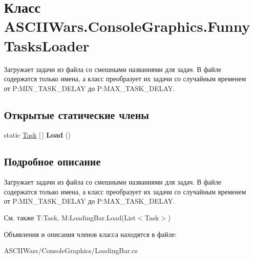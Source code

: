\hypertarget{class_a_s_c_i_i_wars_1_1_console_graphics_1_1_funny_tasks_loader}{}\section{Класс A\+S\+C\+I\+I\+Wars.\+Console\+Graphics.\+Funny\+Tasks\+Loader}
\label{class_a_s_c_i_i_wars_1_1_console_graphics_1_1_funny_tasks_loader}


Загружает задачи из файла со смешными названиями для задач. В файле содержатся только имена, а класс преобразует их задачи со случайным временем от P\+:\+M\+I\+N\+\_\+\+T\+A\+S\+K\+\_\+\+D\+E\+L\+AY до P\+:\+M\+A\+X\+\_\+\+T\+A\+S\+K\+\_\+\+D\+E\+L\+AY.  


\subsection*{Открытые статические члены}
\begin{DoxyCompactItemize}
\item 
\hypertarget{class_a_s_c_i_i_wars_1_1_console_graphics_1_1_funny_tasks_loader_a31fd5789c12ebfb455dc594a35a8316c}{}\label{class_a_s_c_i_i_wars_1_1_console_graphics_1_1_funny_tasks_loader_a31fd5789c12ebfb455dc594a35a8316c} 
static \hyperlink{class_a_s_c_i_i_wars_1_1_console_graphics_1_1_task}{Task} \mbox{[}$\,$\mbox{]} {\bfseries Load} ()
\end{DoxyCompactItemize}


\subsection{Подробное описание}
Загружает задачи из файла со смешными названиями для задач. В файле содержатся только имена, а класс преобразует их задачи со случайным временем от P\+:\+M\+I\+N\+\_\+\+T\+A\+S\+K\+\_\+\+D\+E\+L\+AY до P\+:\+M\+A\+X\+\_\+\+T\+A\+S\+K\+\_\+\+D\+E\+L\+AY. 

\begin{DoxySeeAlso}{См. также}
T\+:\+Task, M\+:\+Loading\+Bar.\+Load(\+List$<$\+Task$>$)


\end{DoxySeeAlso}


Объявления и описания членов класса находятся в файле\+:\begin{DoxyCompactItemize}
\item 
A\+S\+C\+I\+I\+Wars/\+Console\+Graphics/Loading\+Bar.\+cs\end{DoxyCompactItemize}
